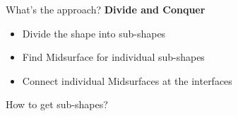 \begin{frame}[t]
\begin{columns}[t]
\begin{column}{\twocolwid}

\begin{block}{What's the approach?}
\textbf{Divide and Conquer}
\begin{itemize}
\item Divide the shape into sub-shapes
\item Find Midsurface for individual sub-shapes
\item Connect individual Midsurfaces at the interfaces
\end{itemize}
\end{block}

\begin{block}{How to get sub-shapes?}


\end{block}
\end{column}
\end{columns}
\end{frame}
